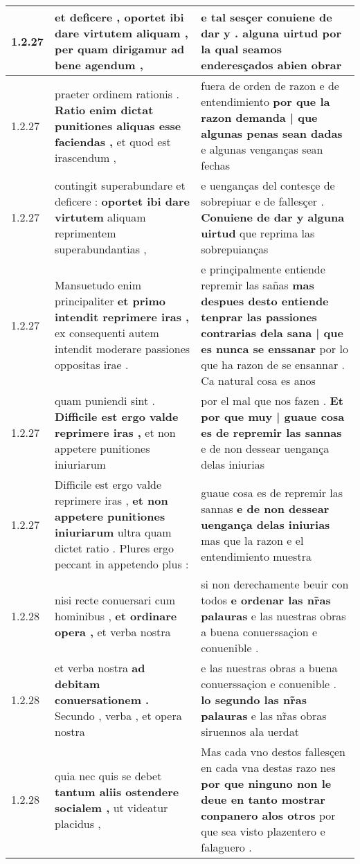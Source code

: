 \begin{tabular}{|p{1cm}|p{6.5cm}|p{6.5cm}|}
1.2.27 & et deficere , \textbf{ oportet ibi dare virtutem aliquam , } per quam dirigamur ad bene agendum , & e tal sesçer conuiene de dar y . \textbf{ alguna uirtud por la qual seamos enderesçados } abien obrar \\\hline
1.2.27 & praeter ordinem rationis . \textbf{ Ratio enim dictat punitiones aliquas esse faciendas , } et quod est irascendum , & fuera de orden de razon e de entendimiento \textbf{ por que la razon demanda | que algunas penas sean dadas } e algunas venganças sean fechas \\\hline
1.2.27 & contingit superabundare et deficere : \textbf{ oportet ibi dare virtutem } aliquam reprimentem superabundantias , & e uenganças del contesçe de sobrepiuar e de fallesçer . \textbf{ Conuiene de dar y alguna uirtud } que reprima las sobrepuianças \\\hline
1.2.27 & Mansuetudo enim principaliter \textbf{ et primo intendit reprimere iras , } ex consequenti autem intendit moderare passiones oppositas irae . & e prinçipalmente entiende repremir las sañas \textbf{ mas despues desto entiende tenprar las passiones contrarias dela sana | que es nunca se enssanar } por lo que ha razon de se ensannar . Ca natural cosa es anos \\\hline
1.2.27 & quam puniendi sint . \textbf{ Difficile est ergo valde reprimere iras , } et non appetere punitiones iniuriarum & por el mal que nos fazen . \textbf{ Et por que muy | guaue cosa es de repremir las sannas } e de non dessear uengança delas iniurias \\\hline
1.2.27 & Difficile est ergo valde reprimere iras , \textbf{ et non appetere punitiones iniuriarum } ultra quam dictet ratio . Plures ergo peccant in appetendo plus : & guaue cosa es de repremir las sannas \textbf{ e de non dessear uengança delas iniurias } mas que la razon e el entendimiento muestra \\\hline
1.2.28 & nisi recte conuersari cum hominibus , \textbf{ et ordinare opera , } et verba nostra & si non derechamente beuir con todos \textbf{ e ordenar las nr̃as palauras } e las nuestras obras a buena conuerssaçion e conuenible . \\\hline
1.2.28 & et verba nostra \textbf{ ad debitam conuersationem . } Secundo , verba , et opera nostra & e las nuestras obras a buena conuerssaçion e conuenible . \textbf{ lo segundo las nr̃as palauras } e las nr̃as obras siruennos ala uerdat \\\hline
1.2.28 & quia nec quis se debet \textbf{ tantum aliis ostendere socialem , } ut videatur placidus , & Mas cada vno destos fallesçen en cada vna destas razo nes \textbf{ por que ninguno non le deue en tanto mostrar conpanero alos otros } por que sea visto plazentero e falaguero . \\\hline

\end{tabular}
